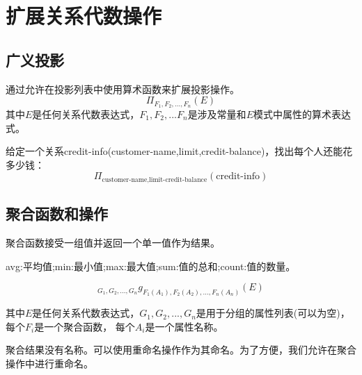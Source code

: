 \section{扩展关系代数操作}

\subsection{广义投影}

通过允许在投影列表中使用算术函数来扩展投影操作。
$$\Pi_{F_1,F_2,...,F_n}(E)$$
其中$E$是任何关系代数表达式，$F_1,F_2,...F_n$是涉及常量和$E$模式中属性的算术表达式。

给定一个关系credit-info(customer-name,limit,credit-balance)，找出每个人还能花多少钱：
$$\Pi_{\text{customer-name,limit-credit-balance}}(\text{credit-info})$$

\subsection{聚合函数和操作}

聚合函数接受一组值并返回一个单一值作为结果。

avg:平均值;min:最小值;max:最大值;sum:值的总和;count:值的数量。

$$_{G_1,G_2,...,G_n}g_{F_1(A_1),F_2(A_2),...,F_n(A_n)}(E)$$

其中$E$是任何关系代数表达式，$G_1,G_2,...,G_n$是用于分组的属性列表(可以为空)，每个$F_i$是一个聚合函数，
每个$A_i$是一个属性名称。

聚合结果没有名称。可以使用重命名操作作为其命名。为了方便，我们允许在聚合操作中进行重命名。

